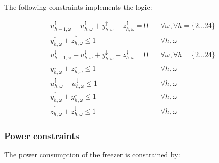 \noindent The following constraints implements the logic:

\begin{subequations}\label{eq:auxillary_constraints}
    \begin{align}
        u_{h-1,\omega}^{\uparrow} - u_{h,\omega}^{\uparrow} + y_{h,\omega}^{\uparrow} - z_{h,\omega}^{\uparrow} = 0 \quad         & \forall{\omega}, \forall{h} = \{2 \ldots 24 \} \\
        y_{h,\omega}^{\uparrow} + z_{h,\omega}^{\uparrow} \leq 1 \quad                                                            & \forall{h,\omega}                              \\
        u_{h-1,\omega}^{\downarrow} - u_{h,\omega}^{\downarrow} + y_{h,\omega}^{\downarrow} - z_{h,\omega}^{\downarrow} = 0 \quad & \forall{\omega}, \forall{h} = \{2 \ldots 24 \} \\
        y_{h,\omega}^{\downarrow} + z_{h,\omega}^{\downarrow} \leq 1 \quad                                                        & \forall{h,\omega}                              \\
        u_{h,\omega}^{\uparrow} + u_{h,\omega}^{\downarrow} \leq 1 \quad                                                          & \forall{h,\omega}                              \\
        y_{h,\omega}^{\uparrow} + y_{h,\omega}^{\downarrow} \leq 1 \quad                                                          & \forall{h,\omega}                              \\
        z_{h,\omega}^{\uparrow} + z_{h,\omega}^{\downarrow} \leq 1 \quad                                                          & \forall{h,\omega}
    \end{align}
\end{subequations}

\subsubsection{Power constraints}\label{sec:power_constraints}

The power consumption of the freezer is constrained by:

